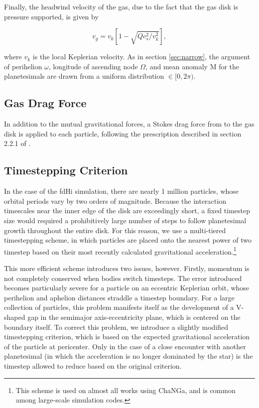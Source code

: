 \documentclass[twocolumn]{aastex63}
\begin{document}
Finally, the headwind velocity of the gas, due to the fact that the gas disk is pressure supported, is given by

\begin{equation}\label{eq:v_gas}
	v_{g} = v_{k} \left[ 1 - \sqrt{ Q c_{s}^2 / v_{k}^2} \right],
\end{equation}

\noindent where $v_{k}$ is the local Keplerian velocity. As in section
\ref{sec:narrow}, the argument of perihelion $\omega$, longitude of
ascending node $\Omega$, and mean anomaly M for the planetesimals are drawn from a uniform distribution $\in [0, 2 \pi)$.

\subsection{Gas Drag Force}

In addition to the mutual gravitational forces, a Stokes drag force from to the gas disk is applied to each particle, following the prescription described in section 2.2.1 of \citet{morishima10}.

\subsection{Timestepping Criterion}

In the case of the fdHi simulation, there are nearly 1 million
particles, whose orbital periods vary by two orders of magnitude. Because the
interaction timescales near the inner edge of the
disk are exceedingly short, a fixed timestep size would required a prohibitively large
number of steps to follow planetesimal growth throughout the entire
disk. For this reason, we use a multi-tiered timestepping scheme, in
which particles are placed onto the nearest power of two timestep
based on their most recently calculated gravitational
acceleration.\footnote{This scheme is used on almost all works using ChaNGa,
and is common among large-scale simulation codes.}

This more efficient scheme introduces two issues, however. Firstly,
momentum is not completely conserved when bodies switch timesteps. The
error introduced becomes particularly severe for a particle on an
eccentric Keplerian orbit, whose perihelion and aphelion distances
straddle a timestep boundary. For a large collection of particles,
this problem manifests itself as the development of a V-shaped gap in the semimajor axis-eccentricity plane, which is centered on the boundary itself. To correct this problem, we introduce a slightly modified timestepping criterion, which is based on the expected gravitational acceleration of the particle at pericenter. Only in the case of a close encounter with another planetesimal (in which the acceleration is no longer dominated by the star) is the timestep allowed to reduce based on the original criterion.
\end{document}

